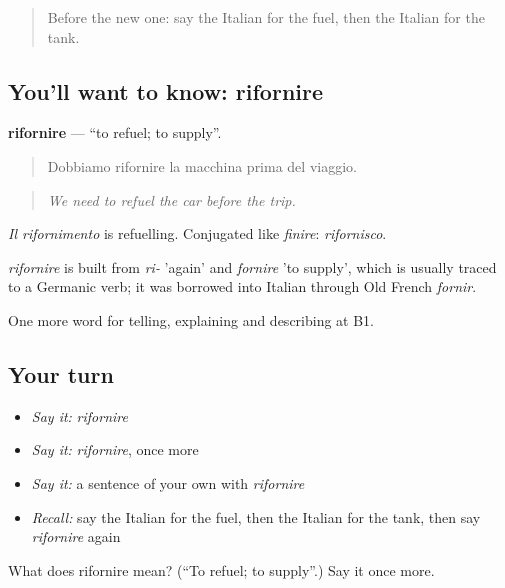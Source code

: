 \label{lesson:IT-C408-rifornire}



\begin{quote}
Before the new one: say the Italian for the fuel, then the Italian for the tank.
\end{quote}

\subsection*{You'll want to know: rifornire}
\textbf{rifornire} — \textquotedblleft{}to refuel; to supply\textquotedblright{}.

\begin{quote}
Dobbiamo rifornire la macchina prima del viaggio.
\end{quote}

\begin{quote}
\emph{We need to refuel the car before the trip.}
\end{quote}

\emph{Il rifornimento} is refuelling. Conjugated like \emph{finire}: \emph{rifornisco}.

\begin{cousinweb}
\emph{rifornire} is built from \emph{ri-} 'again' and \emph{fornire} 'to supply', which is usually traced to a Germanic verb; it was borrowed into Italian through Old French \emph{fornir}.
\end{cousinweb}

\begin{grammarlens}[title={What you've built}]
One more word for telling, explaining and describing at B1.
\end{grammarlens}

\subsection*{Your turn}
\begin{itemize}
\raggedright
  \item \emph{Say it:} \emph{rifornire}
  \item \emph{Say it:} \emph{rifornire}, once more
  \item \emph{Say it:} a sentence of your own with \emph{rifornire}
  \item \emph{Recall:} say the Italian for the fuel, then the Italian for the tank, then say \emph{rifornire} again
\end{itemize}

\begin{tcolorbox}[breakable,colback=teal!4,colframe=teal!35!black,title={Before you move on}]
What does rifornire mean? (\textquotedblleft{}To refuel; to supply\textquotedblright{}.) Say it once more.
\end{tcolorbox}
